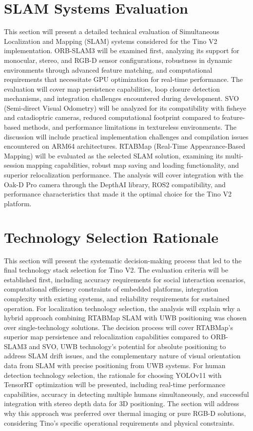 \section{SLAM Systems Evaluation}
This section will present a detailed technical evaluation of Simultaneous Localization and Mapping (SLAM) systems considered for the Tino V2 implementation. ORB-SLAM3 will be examined first, analyzing its support for monocular, stereo, and RGB-D sensor configurations, robustness in dynamic environments through advanced feature matching, and computational requirements that necessitate GPU optimization for real-time performance. The evaluation will cover map persistence capabilities, loop closure detection mechanisms, and integration challenges encountered during development. SVO (Semi-direct Visual Odometry) will be analyzed for its compatibility with fisheye and catadioptric cameras, reduced computational footprint compared to feature-based methods, and performance limitations in textureless environments. The discussion will include practical implementation challenges and compilation issues encountered on ARM64 architectures. RTABMap (Real-Time Appearance-Based Mapping) will be evaluated as the selected SLAM solution, examining its multi-session mapping capabilities, robust map saving and loading functionality, and superior relocalization performance. The analysis will cover integration with the Oak-D Pro camera through the DepthAI library, ROS2 compatibility, and performance characteristics that made it the optimal choice for the Tino V2 platform.

\section{Technology Selection Rationale}
This section will present the systematic decision-making process that led to the final technology stack selection for Tino V2. The evaluation criteria will be established first, including accuracy requirements for social interaction scenarios, computational efficiency constraints of embedded platforms, integration complexity with existing systems, and reliability requirements for sustained operation. For localization technology selection, the analysis will explain why a hybrid approach combining RTABMap SLAM with UWB positioning was chosen over single-technology solutions. The decision process will cover RTABMap's superior map persistence and relocalization capabilities compared to ORB-SLAM3 and SVO, UWB technology's potential for absolute positioning to address SLAM drift issues, and the complementary nature of visual orientation data from SLAM with precise positioning from UWB systems. For human detection technology selection, the rationale for choosing YOLOv11 with TensorRT optimization will be presented, including real-time performance capabilities, accuracy in detecting multiple humans simultaneously, and successful integration with stereo depth data for 3D positioning. The section will address why this approach was preferred over thermal imaging or pure RGB-D solutions, considering Tino's specific operational requirements and physical constraints.

